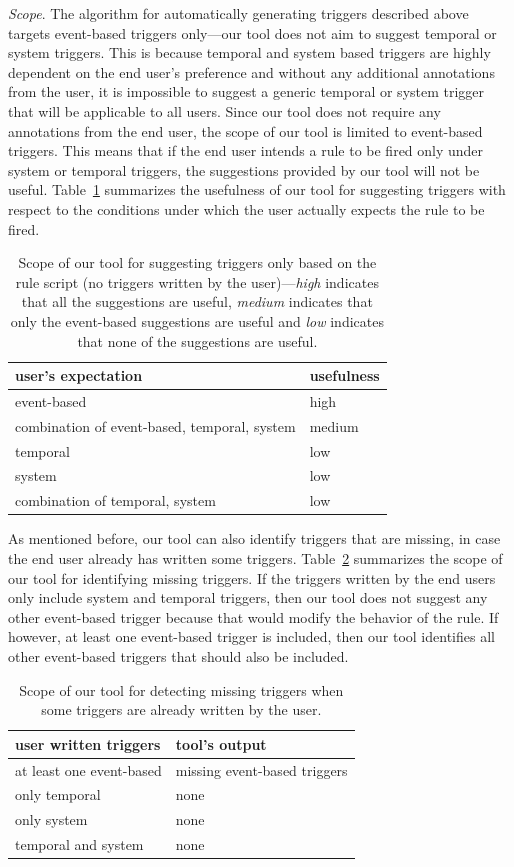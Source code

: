 \documentclass{sig-alternate-05-2015}
\begin{document}
\emph{Scope}. The algorithm for automatically generating triggers described above targets event-based triggers only---our tool does not aim to suggest temporal or system triggers. This is because temporal and system based triggers are highly dependent on the end user's preference and without any additional annotations from the user, it is impossible to suggest a generic temporal or system trigger that will be applicable to all users. Since our tool does not require any annotations from the end user, the scope of our tool is limited to event-based triggers. This means that if the end user intends a rule to be fired only under system or temporal triggers, the suggestions provided by our tool will not be useful. Table~\ref{tab:scope1} summarizes the usefulness of our tool for suggesting triggers with respect to the conditions under which the user actually expects the rule to be fired.
\begin{table}[ht]
\centering
\begin{tabular}{|l|l|}
\hline
user's expectation & usefulness \\ \hline
event-based & high \\ \hline
combination of event-based, temporal, system  & medium \\ \hline
temporal & low \\\hline
system & low \\ \hline
combination of temporal, system & low  \\ \hline
\end{tabular}
\caption{Scope of our tool for suggesting triggers only based on the rule script (no triggers written by the user)---\textit{high} indicates that all the suggestions are useful, \textit{medium} indicates that only the event-based suggestions are useful and \textit{low} indicates that none of the suggestions are useful. }
\label{tab:scope1}
\end{table}

As mentioned before, our tool can also identify triggers that are missing, in case the end user already has written some triggers. Table~\ref{tab:scope2} summarizes the scope of our tool for identifying missing triggers. If the triggers written by the end users only include system and temporal triggers, then our tool does not suggest any other event-based trigger because that would modify the behavior of the rule. If however, at least one event-based trigger is included, then our tool identifies all other event-based triggers that should also be included. 
\begin{table}[ht]
\centering
\begin{tabular}{|l|l|}
\hline
user written triggers & tool's output \\ \hline
at least one event-based & missing event-based triggers \\ \hline
only temporal & none \\\hline
only system & none \\ \hline
temporal and system & none  \\ \hline
\end{tabular}
\caption{Scope of our tool for detecting missing triggers when some triggers are already written by the user.}
\label{tab:scope2}
\end{table}
\end{document}
